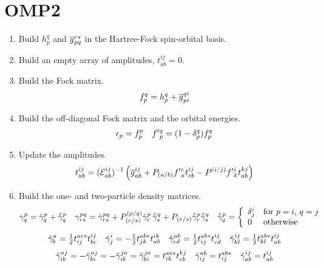 \documentclass[11pt]{article}
\newcommand{\oc}[1]{\ensuremath{\accentset{\circ}{#1}}}
\begin{document}
\section*{OMP2}


\begin{enumerate}
\item
Build $h_p^q$ and $\overline{g}_{pq}^{rs}$ in the Hartree-Fock spin-orbital basis.

\item
Build an empty array of amplitudes, $t_{ab}^{ij}=0$.

\item
\label{item:recursive-step}
Build the Fock matrix.
\begin{align}
  f_p^q
=
  h_p^q
+
  \overline{g}_{pi}^{qi}
\end{align}

\item
Build the off-diagonal Fock matrix and the orbital energies.
\begin{align}
  \epsilon _p
=
  f_p^p
&&
  f'{}_p^q
=
  (1 - \delta _p^q)
  f_p^q
\end{align}

\item
\label{itemocc-step-one}
Update the amplitudes.
\begin{align}
  t_{ab}^{ij}
=
  (\mathcal{E}_{ab}^{ij})^{-1}
  \left(
    \overline{g}_{ab}^{ij}
  +
    P_{(a/b)}
    f'{}_a^c
    t_{cb}^{ij}
  -
    P^{(i/j)}
    f'{}_k^i
    t_{ab}^{kj}
  \right)
\end{align}

\item
Build the one- and two-particle density matrices.
\begin{align}
  \g^p_q
=
  \tl{\g}^p_q
+
  \oc{\g}^p_q
&&
  \g^{pq}_{rs}
=
  \tl{\g}^{pq}_{rs}
+
  P^{(p/q)}_{(r/s)}
  \tl{\g}^p_r\,
  \oc{\g}^q_s
+
  P_{(r/s)}
  \oc{\g}^p_r
  \oc{\g}^q_s
&&
  \oc{\g}^p_q
=
\left\{
\begin{array}{ll}
  \d^i_j
&
  \text{for $p=i$, $q=j$}
\\
  0
&
  \text{otherwise}
\end{array}
\right.
\end{align}
\begin{align}
  \tilde{\gamma }^a_b
=
  \tfrac{1}{2}
  t^{ac*}_{ij}
  t_{bc}^{ij}
&&
  \tilde{\gamma }^i_j
=
-
  \tfrac{1}{2}
  t^{ab*}_{jk}
  t_{ab}^{ik}
&&
  \tilde{\gamma }^{ab}_{cd}
=
  \tfrac{1}{2}
  t^{ab*}_{ij}
  t_{cd}^{ij}
&&
  \tilde{\gamma }^{ij}_{kl}
=
  \tfrac{1}{2}
  t^{ab*}_{kl}
  t_{ab}^{ij}
\end{align}
\begin{align}
  \tilde{\gamma }^{aj}_{ib}
=
-
  \tilde{\gamma }^{aj}_{bi}
=
-
  \tilde{\gamma }^{ja}_{ib}
=
  \tilde{\gamma }^{ja}_{bi}
=
  t^{ac*}_{ik}
  t_{cb}^{kj}
&&
  \tilde{\gamma }_{ij}^{ab}
=
  t_{ij}^{ab*}
&&
  \tilde{\gamma }_{ab}^{ij}
=
  t_{ab}^{ij}
\end{align}


\end{enumerate}
\end{document}
